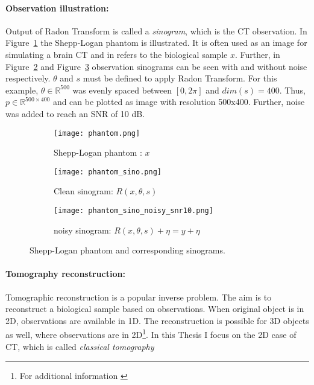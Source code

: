 \paragraph{Observation illustration:}

Output of Radon Transform is called a \textit{sinogram}, which is the CT observation.
In Figure~\ref{fig:phantom} the Shepp-Logan phantom is illustrated.
It is often used as an image for simulating a brain CT and in refers to the biological sample $x$. 
Further, in Figure~\ref{fig:phantom_sinogram} and Figure~\ref{fig:phantom_sinogram_noisy} 
observation sinograms can be seen with and without noise respectively. 
$\theta$ and $s$ must be defined to apply Radon Transform.
For this example, $\theta \in \mathbb{R}^{500}$ was evenly spaced
between $[0, 2 \pi]$ and $dim(s) = 400$. 
Thus, $p \in \mathbb{R}^{500 \times 400}$ and can be plotted as image with resolution 500x400. 
Further, noise was added to reach an SNR of 10 dB.


\begin{figure}[H]
    \captionsetup[subfigure]{justification=centering}
    \centering
    \begin{subfigure}[t]{0.3\textwidth}
        \texttt{[image: phantom.png]}
        \caption{Shepp-Logan phantom : $x$}
        \label{fig:phantom}
    \end{subfigure}\hfill
    \begin{subfigure}[t]{0.3\textwidth}
      \texttt{[image: phantom\_sino.png]}
      \caption{Clean sinogram: $R(x, \theta, s)$}
      \label{fig:phantom_sinogram}
    \end{subfigure}\hfill
    \begin{subfigure}[t]{0.3\textwidth}
      \texttt{[image: phantom\_sino\_noisy\_snr10.png]}
      \caption{noisy sinogram: $R(x, \theta, s) + \eta = y + \eta$}
      \label{fig:phantom_sinogram_noisy}
    \end{subfigure}
    \caption{Shepp-Logan phantom and corresponding sinograms.}
    \label{fig:phantom_and_sinos}
  \end{figure}


\paragraph{Tomography reconstruction:}

Tomographic reconstruction is a popular inverse problem. 
The aim is to reconstruct a biological sample based on observations.
When original object is in 2D, observations are available in 1D. 
The reconstruction is possible for 3D objects as well, where observations are in 2D\footnote{For additional information \cite{tomographicReconstruction}}.
In this Thesis I focus on the 2D case of CT, which is called \textit{classical tomography }


